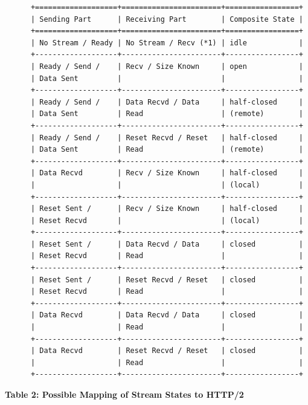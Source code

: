 \documentclass{article}
\begin{document}
\begin{verbatim}
      +===================+=======================+=================+
      | Sending Part      | Receiving Part        | Composite State |
      +===================+=======================+=================+
      | No Stream / Ready | No Stream / Recv (*1) | idle            |
      +-------------------+-----------------------+-----------------+
      | Ready / Send /    | Recv / Size Known     | open            |
      | Data Sent         |                       |                 |
      +-------------------+-----------------------+-----------------+
      | Ready / Send /    | Data Recvd / Data     | half-closed     |
      | Data Sent         | Read                  | (remote)        |
      +-------------------+-----------------------+-----------------+
      | Ready / Send /    | Reset Recvd / Reset   | half-closed     |
      | Data Sent         | Read                  | (remote)        |
      +-------------------+-----------------------+-----------------+
      | Data Recvd        | Recv / Size Known     | half-closed     |
      |                   |                       | (local)         |
      +-------------------+-----------------------+-----------------+
      | Reset Sent /      | Recv / Size Known     | half-closed     |
      | Reset Recvd       |                       | (local)         |
      +-------------------+-----------------------+-----------------+
      | Reset Sent /      | Data Recvd / Data     | closed          |
      | Reset Recvd       | Read                  |                 |
      +-------------------+-----------------------+-----------------+
      | Reset Sent /      | Reset Recvd / Reset   | closed          |
      | Reset Recvd       | Read                  |                 |
      +-------------------+-----------------------+-----------------+
      | Data Recvd        | Data Recvd / Data     | closed          |
      |                   | Read                  |                 |
      +-------------------+-----------------------+-----------------+
      | Data Recvd        | Reset Recvd / Reset   | closed          |
      |                   | Read                  |                 |
      +-------------------+-----------------------+-----------------+
\end{verbatim}

\begin{center}
\textbf{Table 2: Possible Mapping of Stream States to HTTP/2}
\end{center}
\end{document}
